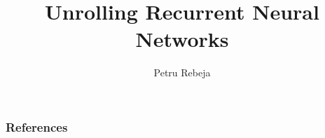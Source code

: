 \documentclass{beamer}
\title{Unrolling Recurrent Neural Networks}
\author{Petru Rebeja}
\begin{document}
\maketitle
\begin{frame}[allowframebreaks]
  \frametitle{References}
  
  
\end{frame}
\end{document}
